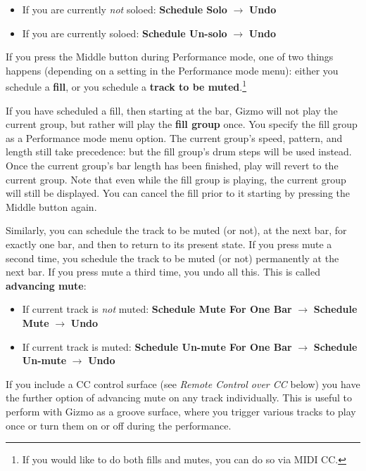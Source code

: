 \documentclass{article}
\begin{document}
\vspace{-0.25em}
\begin{itemize}
\item If you are currently {\it not} soloed: {\bf Schedule Solo} \(\rightarrow\) {\bf Undo}
\item If you are currently soloed: {\bf Schedule Un-solo} \(\rightarrow\) {\bf Undo}
\end{itemize}

\vspace{-0.25em}
If you press the Middle button during Performance mode, one of two things happens (depending on a setting in the Performance mode menu): either you schedule a {\bf fill}, or you schedule a {\bf track to be muted}.\footnote{If you would like to do both fills and mutes, you can do so via MIDI CC.}

If you have scheduled a fill, then starting at the bar, Gizmo will not play the current group, but rather will play the {\bf fill group} once.  You specify the fill group as a Performance mode menu option.  The current group's speed, pattern, and length still take precedence: but the fill group's drum steps will be used instead.  Once the current group's bar length has been finished, play will revert to the current group.  Note that even while the fill group is playing, the current group will still be displayed. You can cancel the fill prior to it starting by pressing the Middle button again.  

Similarly, you can schedule the track to be muted (or not), at the next bar, for exactly one bar, and then to return to its present state.  If you press mute a second time, you schedule the track to be muted (or not) permanently at the next bar.  If you press mute a third time, you undo all this.  This is called {\bf advancing mute}:

\vspace{-0.25em}
\begin{itemize}
\item If current track is {\it not} muted: {\bf Schedule Mute For One Bar} \(\rightarrow\)  {\bf Schedule Mute} \(\rightarrow\) {\bf Undo}
\item If current track is muted: {\bf Schedule Un-mute For One Bar} \(\rightarrow\)  {\bf Schedule Un-mute} \(\rightarrow\) {\bf Undo}
\end{itemize}

\vspace{-0.25em}
If you include a CC control surface (see {\it Remote Control over CC} below) you have the further option of advancing mute on any track individually.  This is useful to perform with Gizmo as a groove surface, where you trigger various tracks to play once or turn them on or off during the performance.
\end{document}

